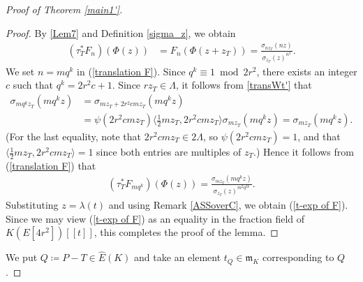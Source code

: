 \documentclass[11pt]{amsart}
\theoremstyle{definition}
\begin{document}
\begin{proof}[Proof of Theorem \ref{main1'}]
\begin{proof}
By \eqref{Lem7} and Definition \ref{sigma_z}, we obtain
%
\begin{align}\label{translation F}
(\tau_T^\ast F_n)(\Phi(z))
&=F_n(\Phi(z+z_T))=\frac{\sigma_{nz_T}(nz)}{\sigma_{z_T}(z)^{n^2}}.
\end{align}
%
We set $n=mq^k$ in (\ref{translation F}).
Since $q^k \equiv 1 \bmod 2r^2$, there exists an integer $c$ such that $q^k=2r^2c+1$. Since $rz_T \in \Lambda$, it follows from \eqref{transWt'} that 
%
\begin{align*}
\sigma_{mq^kz_T}(mq^kz)&=\sigma_{mz_T+2r^2cmz_T}(mq^kz) \\
&=\psi(2r^2cmz_T)\langle \frac{1}{2}mz_T, 2r^2cmz_T \rangle \sigma_{mz_T}(mq^kz)=\sigma_{mz_T}(mq^kz).
\end{align*}
%
(For the last equality, note that $2r^2cmz_T \in 2\Lambda$, so
$\psi(2r^2cmz_T)=1$, and that
$\langle \frac{1}{2}mz_T, 2r^2cmz_T \rangle =1$ since both entries are
multiples of $z_T$.)
Hence it follows from (\ref{translation F}) that
%
\begin{align*}
(\tau_T^\ast F_{mq^k})(\Phi(z))
=\frac{\sigma_{mz_T}(mq^kz)}{\sigma_{z_T}(z)^{m^2q^{2k}}}.
\end{align*}
%
Substituting $z=\lambda(t)$ and using Remark \ref{ASSoverC}, we obtain (\ref{t-exp of F}). Since we may view (\ref{t-exp of F}) as an equality in the fraction field of $K(E[4r^2])[[t]]$, this completes the proof of the lemma.
\end{proof}



We put $Q \coloneqq P-T \in \hat{E}(K)$ and take an element $t_Q\in \mathfrak{m}_K$ corresponding to $Q$.


\end{proof}
\end{document}
